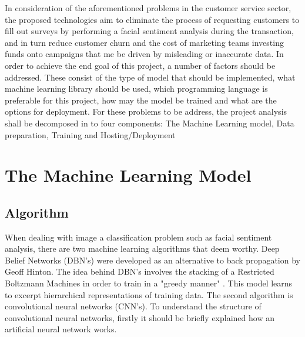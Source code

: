 In consideration of the aforementioned problems in the customer service sector, the proposed technologies aim to eliminate the process of requesting customers to fill out surveys by performing a facial sentiment analysis during the transaction, and in turn reduce customer churn and the cost of marketing teams investing funds onto campaigns that me be driven by misleading or inaccurate data. In order to achieve the end goal of this project, a number of factors should be addressed. These consist of the type of model that should be implemented, what machine learning library should be used, which programming language is preferable for this project, how may the model be trained and what are the options for deployment. For these problems to be address, the project analysis shall be decomposed in to four components: The Machine Learning model, Data preparation, Training and Hosting/Deployment


 	
 	


\section{The Machine Learning Model}


\subsection{Algorithm}
When dealing with image a classification problem such as facial sentiment analysis, there are two machine learning algorithms that deem worthy. Deep Belief Networks (DBN's) were developed as an alternative to back propagation by Geoff Hinton. The idea behind DBN's involves the stacking of a Restricted Boltzmann Machines in order to train in a "greedy manner" \citep{dbn}. This model learns to excerpt hierarchical representations of training data. The second algorithm is convolutional neural networks (CNN's). %
To understand the structure of convolutional neural networks, firstly it should be briefly explained how an artificial neural network works.

